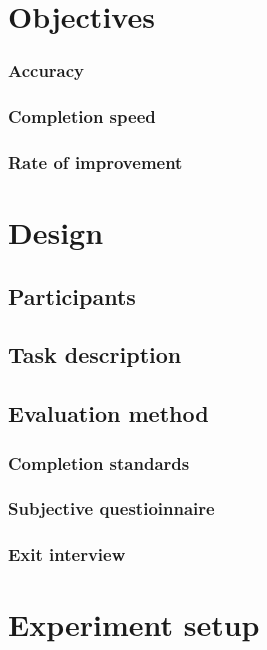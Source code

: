 \chapter{Objectives}
  \subsection{Accuracy}
  \subsection{Completion speed}
  \subsection{Rate of improvement}
\chapter{Design}
\section{Participants}
\section{Task description}
\section{Evaluation method}
  \subsection{Completion standards}
  \subsection{Subjective questioinnaire}
  \subsection{Exit interview}
\chapter{Experiment setup}
